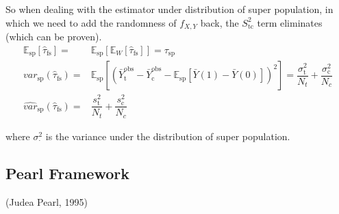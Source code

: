\begin{itemize}[topsep=2pt,itemsep=0pt]
    So when dealing with the estimator under distribution of super population, in which we need to add the randomness of $ f_{X,Y} $ back, the $ S^2_\mathrm{tc}  $ term eliminates (which can be proven).
    \begin{align*}
        \mathbb{E}_\mathrm{sp} \left[ \hat{\tau}_\mathrm{fs}  \right] = & \mathbb{E}_\mathrm{sp} \left[ \mathbb{E}_W \left[ \hat{\tau}_\mathrm{fs}  \right] \right] = \tau_\mathrm{sp}  \\
        var_\mathrm{sp} (\hat{\tau}_\mathrm{fs} )=&\mathbb{E}_\mathrm{sp} \left[( \bar{Y}_\mathrm{t} ^\mathrm{obs}-\bar{Y}_\mathrm{c}^\mathrm{obs}-\mathbb{E}_\mathrm{sp} \left[ \bar{Y}(1)-\bar{Y}(0) \right]    )^2 \right] = \dfrac{\sigma _\mathrm{t}^2 }{N_t}+\dfrac{\sigma _\mathrm{c}^2 }{N_c}\\
        \hat{var}_\mathrm{sp}(\hat{\tau}_\mathrm{fs} )=&\dfrac{s_\mathrm{t}^2 }{N_t}+\dfrac{s_\mathrm{c}^2 }{N_c} 
    \end{align*}

    where $ \sigma ^2_\cdot $ is the variance under the distribution of super population.
    
    
\end{itemize}























\subsection{Pearl Framework}
 (Judea Pearl, 1995)


